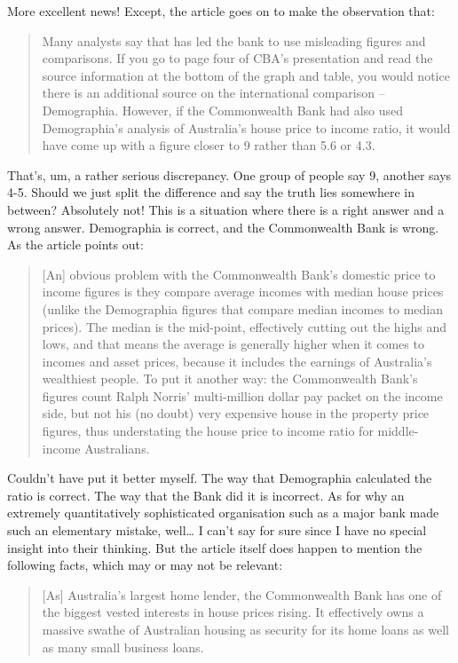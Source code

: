 \documentclass[
  a4paper,
]{book}
\begin{document}
More excellent news! Except, the article goes on to make the observation
that:

\begin{quote}
Many analysts say that has led the bank to use misleading figures and
comparisons. If you go to page four of CBA's presentation and read the
source information at the bottom of the graph and table, you would
notice there is an additional source on the international comparison --
Demographia. However, if the Commonwealth Bank had also used
Demographia's analysis of Australia's house price to income ratio, it
would have come up with a figure closer to 9 rather than 5.6 or 4.3.
\end{quote}

That's, um, a rather serious discrepancy. One group of people say 9,
another says 4-5. Should we just split the difference and say the truth
lies somewhere in between? Absolutely not! This is a situation where
there is a right answer and a wrong answer. Demographia is correct, and
the Commonwealth Bank is wrong. As the article points out:

\begin{quote}
{[}An{]} obvious problem with the Commonwealth Bank's domestic price to
income figures is they compare average incomes with median house prices
(unlike the Demographia figures that compare median incomes to median
prices). The median is the mid-point, effectively cutting out the highs
and lows, and that means the average is generally higher when it comes
to incomes and asset prices, because it includes the earnings of
Australia's wealthiest people. To put it another way: the Commonwealth
Bank's figures count Ralph Norris' multi-million dollar pay packet on
the income side, but not his (no doubt) very expensive house in the
property price figures, thus understating the house price to income
ratio for middle-income Australians.
\end{quote}

Couldn't have put it better myself. The way that Demographia calculated
the ratio is correct. The way that the Bank did it is incorrect. As for
why an extremely quantitatively sophisticated organisation such as a
major bank made such an elementary mistake, well\ldots{} I can't say for
sure since I have no special insight into their thinking. But the
article itself does happen to mention the following facts, which may or
may not be relevant:

\begin{quote}
{[}As{]} Australia's largest home lender, the Commonwealth Bank has one
of the biggest vested interests in house prices rising. It effectively
owns a massive swathe of Australian housing as security for its home
loans as well as many small business loans.
\end{quote}
\end{document}
